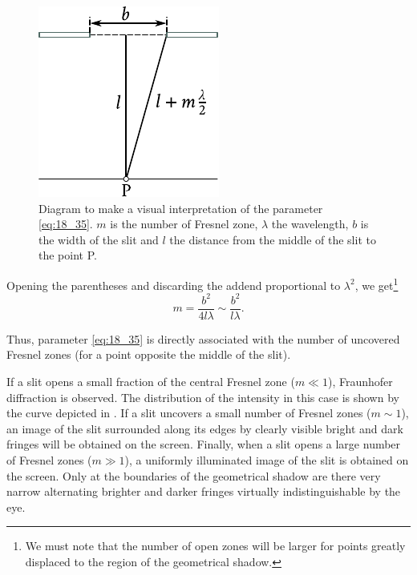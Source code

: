 \begin{figure}[t]
	\begin{center}
		\includegraphics[scale=0.95]{figures/ch_18/fig_18_31.pdf}
        \caption[]{Diagram to make a visual interpretation of the parameter \eqref{eq:18_35}. $m$ is the number of Fresnel zone, $\lambda$ the wavelength, $b$ is the width of the slit and $l$ the distance from the middle of the slit to the point P.}
		\label{fig:18_31}
	\end{center}
	\vspace{-0.8cm}
\end{figure}

Opening the parentheses and discarding the addend proportional to $\lambda^2$, we get\footnote{We must note that the number of open zones will be larger for points greatly displaced to the region of the geometrical shadow.}
\vspace{-12pt}
\begin{equation}\label{eq:18_37}
	m = \frac{b^2}{4l\lambda} \sim \frac{b^2}{l\lambda}.
\end{equation}

\noindent
Thus, parameter \eqref{eq:18_35} is directly associated with the number of uncovered Fresnel zones (for a point opposite the middle of the slit).

If a slit opens a small fraction of the central Fresnel zone ($m\ll 1$), Fraunhofer diffraction is observed.
The distribution of the intensity in this case is shown by the curve depicted in .
If a slit uncovers a small number of Fresnel zones ($m\sim 1$), an image of the slit surrounded along its edges by clearly visible bright and dark fringes will be obtained on the screen.
Finally, when a slit opens a large number of Fresnel zones ($m\gg 1$), a uniformly illuminated
image of the slit is obtained on the screen.
Only at the boundaries of the geometrical shadow are there very narrow alternating brighter and darker fringes virtually indistinguishable by the eye.

